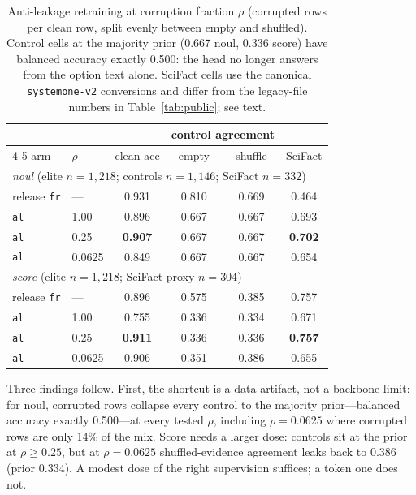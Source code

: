 \documentclass[11pt]{article}
\begin{document}
\begin{table}[t]
\centering\small
\begin{tabular}{llcccc}
\toprule
 & & & \multicolumn{2}{c}{control agreement} & \\
\cmidrule(lr){4-5}
arm & $\rho$ & clean acc & empty & shuffle & SciFact \\
\midrule
\multicolumn{6}{l}{\emph{noul} (elite $n{=}1{,}218$; controls
$n{=}1{,}146$; SciFact $n{=}332$)}\\
release \texttt{fr} & ---    & 0.931 & 0.810 & 0.669 & 0.464 \\
\texttt{al}         & 1.00   & 0.896 & 0.667 & 0.667 & 0.693 \\
\texttt{al}         & 0.25   & \textbf{0.907} & 0.667 & 0.667 &
\textbf{0.702} \\
\texttt{al}         & 0.0625 & 0.849 & 0.667 & 0.667 & 0.654 \\
\midrule
\multicolumn{6}{l}{\emph{score} (elite $n{=}1{,}218$; SciFact proxy
$n{=}304$)}\\
release \texttt{fr} & ---    & 0.896 & 0.575 & 0.385 & 0.757 \\
\texttt{al}         & 1.00   & 0.755 & 0.336 & 0.334 & 0.671 \\
\texttt{al}         & 0.25   & \textbf{0.911} & 0.336 & 0.336 &
\textbf{0.757} \\
\texttt{al}         & 0.0625 & 0.906 & 0.351 & 0.386 & 0.655 \\
\bottomrule
\end{tabular}
\caption{Anti-leakage retraining at corruption fraction $\rho$
(corrupted rows per clean row, split evenly between empty and
shuffled). Control cells at the majority prior (0.667 noul, 0.336
score) have balanced accuracy exactly 0.500: the head no longer
answers from the option text alone. SciFact cells use the canonical
\texttt{systemone-v2} conversions and differ from the legacy-file
numbers in Table~\ref{tab:public}; see text.}
\label{tab:antileak}
\end{table}

Three findings follow. First, the shortcut is a data artifact, not a
backbone limit: for noul, corrupted rows collapse every control to the
majority prior---balanced accuracy exactly 0.500---at every tested
$\rho$, including $\rho{=}0.0625$ where corrupted rows are only 14\%
of the mix. Score needs a larger dose: controls sit at the prior at
$\rho{\geq}0.25$, but at $\rho{=}0.0625$ shuffled-evidence agreement
leaks back to 0.386 (prior 0.334). A modest dose of the right
supervision suffices; a token one does not.
\end{document}

